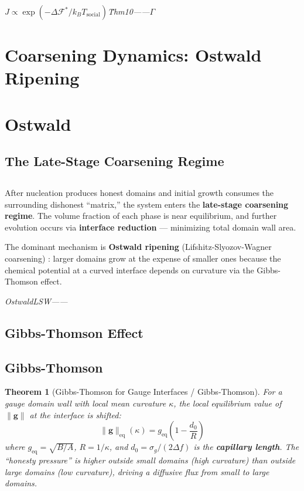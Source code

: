 \documentclass[12pt,a4paper]{article}
\theoremstyle{plain}
\newtheorem{theorem}{ Theorem}[section]
\theoremstyle{definition}
\newcommand{\cF}{\mathcal{F}}
\newcommand{\gf}{\mathbf{g}}          %
\newcommand{\cn}[1]{\textcolor{scxgray}{\textit{#1}}}
\begin{document}
\bigskip
\noindent
\cn{$J \propto \exp(-\Delta\cF^*/k_BT_{\text{social}})$\"\"Thm10——$\Gamma$}

\section{Coarsening Dynamics: Ostwald Ripening}
\section*{Ostwald}

\subsection{The Late-Stage Coarsening Regime}
\subsection*{}

After nucleation produces honest domains and initial growth consumes the
surrounding dishonest ``matrix,'' the system enters the \textbf{late-stage
coarsening regime}. The volume fraction of each phase is near equilibrium,
and further evolution occurs via \textbf{interface reduction} — minimizing
total domain wall area.

The dominant mechanism is \textbf{Ostwald ripening} (Lifshitz-Slyozov-Wagner
coarsening) \cite{lifshitz1961, wagner1961}: larger domains grow at the
expense of smaller ones because the chemical potential at a curved interface
depends on curvature via the Gibbs-Thomson effect.

\bigskip
\noindent
\cn{OstwaldLSW——}

\subsection{Gibbs-Thomson Effect}
\subsection*{Gibbs-Thomson}

\begin{theorem}[Gibbs-Thomson for Gauge Interfaces / Gibbs-Thomson]
\label{thm:gibbs_thomson}
For a gauge domain wall with local mean curvature $\kappa$, the local
equilibrium value of $\|\gf\|$ at the interface is shifted:
\begin{equation}
    \|\gf\|_{\text{eq}}(\kappa) = g_{\text{eq}} \left(1 - \frac{d_0}{R}\right)
    \label{eq:gibbs_thomson}
\end{equation}
where $g_{\text{eq}} = \sqrt{B/A}$, $R = 1/\kappa$, and
$d_0 = \sigma_g/(2\Delta f)$ is the \textbf{capillary length}.
The ``honesty pressure'' is higher outside small domains (high curvature)
than outside large domains (low curvature), driving a diffusive flux
from small to large domains.
\end{theorem}
\end{document}
